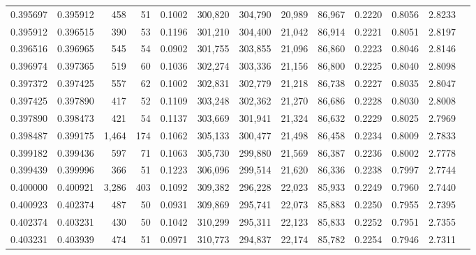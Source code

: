 \begin{tabular}{rrrrrrrrrrrrr}
0.395697 & 0.395912 &   458 &  51 &                                     0.1002 & 300,820 & 304,790 &  20,989 &  86,967 & 0.2220 & 0.8056 & 2.8233 \\
0.395912 & 0.396515 &   390 &  53 &                                     0.1196 & 301,210 & 304,400 &  21,042 &  86,914 & 0.2221 & 0.8051 & 2.8197 \\
0.396516 & 0.396965 &   545 &  54 &                                     0.0902 & 301,755 & 303,855 &  21,096 &  86,860 & 0.2223 & 0.8046 & 2.8146 \\
0.396974 & 0.397365 &   519 &  60 &                                     0.1036 & 302,274 & 303,336 &  21,156 &  86,800 & 0.2225 & 0.8040 & 2.8098 \\
0.397372 & 0.397425 &   557 &  62 &                                     0.1002 & 302,831 & 302,779 &  21,218 &  86,738 & 0.2227 & 0.8035 & 2.8047 \\
0.397425 & 0.397890 &   417 &  52 &                                     0.1109 & 303,248 & 302,362 &  21,270 &  86,686 & 0.2228 & 0.8030 & 2.8008 \\
0.397890 & 0.398473 &   421 &  54 &                                     0.1137 & 303,669 & 301,941 &  21,324 &  86,632 & 0.2229 & 0.8025 & 2.7969 \\
0.398487 & 0.399175 & 1,464 & 174 &                                     0.1062 & 305,133 & 300,477 &  21,498 &  86,458 & 0.2234 & 0.8009 & 2.7833 \\
0.399182 & 0.399436 &   597 &  71 &                                     0.1063 & 305,730 & 299,880 &  21,569 &  86,387 & 0.2236 & 0.8002 & 2.7778 \\
0.399439 & 0.399996 &   366 &  51 &                                     0.1223 & 306,096 & 299,514 &  21,620 &  86,336 & 0.2238 & 0.7997 & 2.7744 \\
0.400000 & 0.400921 & 3,286 & 403 &                                     0.1092 & 309,382 & 296,228 &  22,023 &  85,933 & 0.2249 & 0.7960 & 2.7440 \\
0.400923 & 0.402374 &   487 &  50 &                                     0.0931 & 309,869 & 295,741 &  22,073 &  85,883 & 0.2250 & 0.7955 & 2.7395 \\
0.402374 & 0.403231 &   430 &  50 &                                     0.1042 & 310,299 & 295,311 &  22,123 &  85,833 & 0.2252 & 0.7951 & 2.7355 \\
0.403231 & 0.403939 &   474 &  51 &                                     0.0971 & 310,773 & 294,837 &  22,174 &  85,782 & 0.2254 & 0.7946 & 2.7311 \\

\end{tabular}
